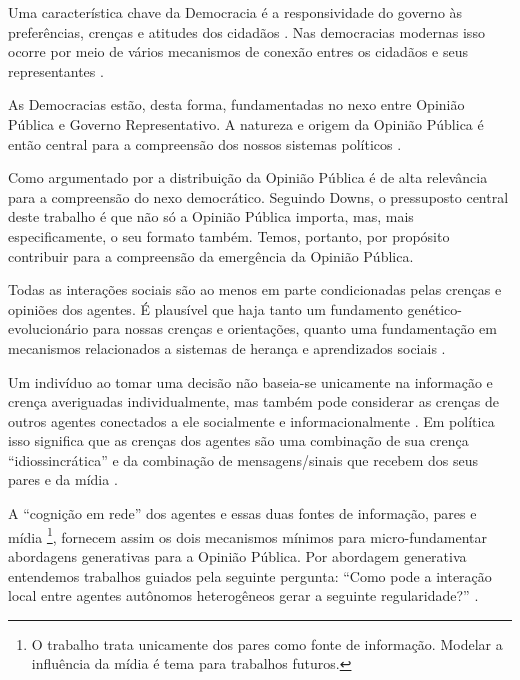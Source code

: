 Uma característica chave da Democracia é a responsividade do governo às
preferências, crenças e atitudes dos cidadãos
\cite{dahl1973polyarchy,bartels2003democracy}. Nas democracias modernas isso
ocorre por meio de vários mecanismos de conexão entres os cidadãos e seus
representantes \cite{dahl1973polyarchy, schumpeter2013capitalism}.

As Democracias estão, desta forma, fundamentadas no nexo entre Opinião Pública e
Governo Representativo. A natureza e origem da Opinião Pública é então
central para a compreensão dos nossos sistemas políticos
\cite{berelson1952democratic}.

Como argumentado por  a distribuição da Opinião
Pública é de alta relevância para a compreensão do nexo democrático. Seguindo
Downs, o pressuposto central deste trabalho é que não só a Opinião Pública
importa, mas, mais especificamente, o seu formato também. Temos, portanto, por
propósito contribuir para a compreensão da emergência da Opinião Pública.

Todas as interações sociais são ao menos em parte condicionadas pelas crenças e
opiniões dos agentes. É plausível que haja tanto um fundamento
genético-evolucionário para nossas crenças e orientações, quanto uma
fundamentação em mecanismos relacionados a sistemas de herança e aprendizados
sociais \cite{jablonka2014evolution, fowler2008biology, fowler2013defense}.

Um indivíduo ao tomar uma decisão não baseia-se unicamente na informação e
crença averiguadas individualmente, mas também pode considerar as crenças de
outros agentes conectados a ele socialmente e informacionalmente
\cite{gintis2016individuality}. Em política isso significa que as crenças dos
agentes são uma combinação de sua crença ``idiossincrática'' e da combinação de
mensagens/sinais que recebem dos seus pares e da mídia
\cite{barabas2004deliberation,ryan2011social}.

A ``cognição em rede'' \cite{gintis2016individuality} dos agentes e essas duas
fontes de informação, pares e mídia \footnote{O trabalho trata unicamente dos
  pares como fonte de informação. Modelar a influência da mídia é tema para
  trabalhos futuros.}, fornecem assim os dois mecanismos mínimos para
micro-fundamentar abordagens generativas para a Opinião Pública. Por abordagem
generativa entendemos trabalhos guiados pela seguinte pergunta: ``Como pode a
interação local entre agentes autônomos heterogêneos gerar a seguinte
regularidade?'' \cite{epstein2006generative}.

